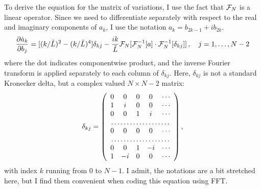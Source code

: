 To derive the equation for the matrix of variations, I use the fact
that ${\cal F}_N$ is a linear operator.  Since we need to
differentiate separately with respect to the real and imaginary
components of $a_k$, I use the notation $a_k = b_{2k-1} + ib_{2k}$.
\begin{equation}
  \frac{\partial \dot{a}_k}{\partial b_j} =
  [(k/\tilde{L})^2-(k/\tilde{L})^4]\delta_{kj} -
  \frac{ik}{\tilde{L}}{\cal F}_N[{\cal F}_N^{-1}[a]\cdot{\cal
  F}_N^{-1}[\delta_{kj}]]\,,\quad j = 1,\ldots,N-2
\end{equation}
where the dot indicates componentwise product, and the inverse
Fourier transform is applied separately to each column of
$\delta_{kj}$. Here, $\delta_{kj}$ is not a standard Kronecker
delta, but a complex valued $N\times N-2$ matrix:
\begin{equation}
  \delta_{kj} = \left(
  \begin{array}{ccccc}
  0 &  0 & 0 &  0 &\cdots\\
  1 &  i & 0 &  0 &\cdots\\
  0 &  0 & 1 &  i &\cdots\\
\multicolumn{5}{c}\dotfill \\
  0 &  0 & 0 &  0 &\cdots\\
\multicolumn{5}{c}\dotfill \\
  0 &  0 & 1 & -i &\cdots\\
  1 & -i & 0 &  0 &\cdots\\
  \end{array}  \right),
\end{equation}
with index $k$ running from 0 to $N-1$.  I admit, the notations are
a bit stretched here, but I find them convenient when coding this
equation using FFT.


